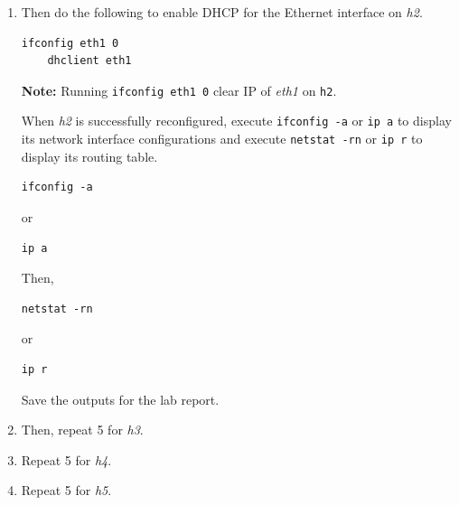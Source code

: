 \documentclass{UTNetLab}
\begin{document}
\begin{enumerate}
        \item Then do the following to enable DHCP for the Ethernet interface on \textit{h2}. 
        
	\begin{lstlisting}[xleftmargin=0.05in]
	ifconfig eth1 0
    dhclient eth1
    \end{lstlisting}

	\textbf{Note: }Running \lstinline{ifconfig eth1 0} clear IP of \textit{eth1} on \lstinline{h2}.

    When \textit{h2} is successfully reconfigured, execute \lstinline{ifconfig -a} or \lstinline{ip a} to display its
   network interface configurations and execute \lstinline{netstat -rn} or \lstinline{ip r} to display its routing table.
        
    \begin{lstlisting}[xleftmargin=0.05in]
    ifconfig -a
    \end{lstlisting}
    or
    
    \begin{lstlisting}[xleftmargin=0.05in]
    ip a
    \end{lstlisting}
    
    Then,
    
    \begin{lstlisting}[xleftmargin=0.05in]
    netstat -rn
    \end{lstlisting}
    or
    
    \begin{lstlisting}[xleftmargin=0.05in]
    ip r
    \end{lstlisting}
    
        Save the outputs for the lab report.
        
        \item Then, repeat 5 for \textit{h3}.
        
        \item Repeat 5 for \textit{h4}.
        
        \item Repeat 5 for \textit{h5}.
    \end{enumerate}
\end{document}
